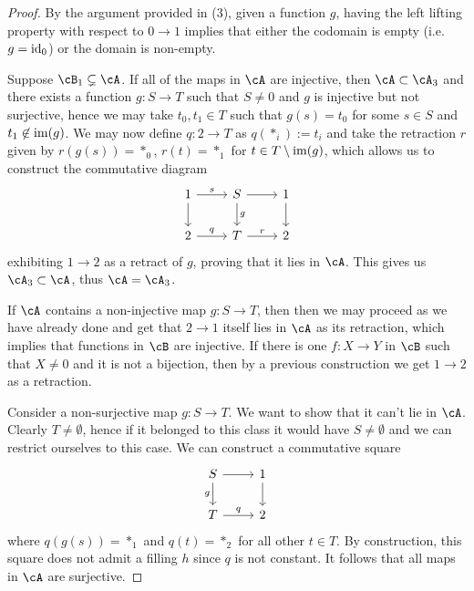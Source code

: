 \documentclass[a4paper,11pt,openany]{scrartcl}
\begin{document}
\begin{proof}
    By the argument provided in (3), given a function $g$, having the left
    lifting property with respect to $0\rightarrow 1$ implies that either the
    codomain is empty (i.e.\ $g=\operatorname{id}_0$) or the domain is non-empty.

    Suppose $\cB_1\subsetneq\cA$. If all of the maps in $\cA$ are injective,
    then $\cA\subset\cA_3$ and there exists a function $g\colon
    S\rightarrow T$ such that $S\neq 0$ and $g$ is injective but not surjective,
    hence we may take $t_0,t_1\in T$ such that $g(s)=t_0$ for some $s\in S$ and
    $t_1\not\in\operatorname{im}(g)$. We may now define $q\colon 2\rightarrow T$ as
    $q(*_i):=t_i$ and take the retraction $r$ given by $r(g(s))=*_0$, $r(t)=*_1$
    for $t\in T\setminus\operatorname{im}(g)$, which allows us to construct the
    commutative diagram
    \[\begin{tikzcd}
	{1} & {S} & {1} \\
	{2} & {T} & {2}
	\arrow["{s}", from=1-1, to=1-2]
	\arrow[from=1-2, to=1-3]
	\arrow["{q}", from=2-1, to=2-2]
	\arrow["{r}", from=2-2, to=2-3]
	\arrow[from=1-1, to=2-1]
	\arrow["{g}", from=1-2, to=2-2]
	\arrow[from=1-3, to=2-3]
    \end{tikzcd}\]
    exhibiting $1\rightarrow 2$ as a retract of $g$, proving that it lies in
    $\cA$. This gives us $\cA_3\subset\cA$, thus $\cA=\cA_3$.

    If $\cA$ contains a non-injective map $g\colon S\rightarrow T$, then then we
    may proceed as we have already done and get that $2\rightarrow 1$
    itself lies in $\cA$ as its
    retraction, which implies that functions in $\cB$ are injective. If there is
    one $f\colon X\rightarrow Y$ in $\cB$ such that $X\neq 0$ and it is not a
    bijection, then by a previous construction we get $1\rightarrow 2$ as a
    retraction.

    Consider a non-surjective map $g\colon S\rightarrow T$. We want to show that
    it can't lie in $\cA$. Clearly $T\neq\emptyset$, hence if it belonged to
    this class it would have $S\neq\emptyset$ and we can restrict ourselves to
    this case. We can
    construct a commutative square
    \[\begin{tikzcd}
	{S} & {1} \\
	{T} & {2}
	\arrow[from=1-1, to=1-2]
	\arrow["{q}", from=2-1, to=2-2]
	\arrow[from=1-2, to=2-2]
	\arrow["{g}"', from=1-1, to=2-1]
    \end{tikzcd}\]
    where $q(g(s))=*_1$ and $q(t)=*_2$ for all other $t\in T$. By construction,
    this square does not admit a filling $h$ since $q$ is not constant. It
    follows that all maps in $\cA$ are surjective.
\end{proof}
\end{document}

